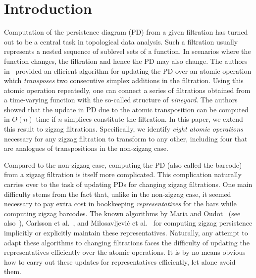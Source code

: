 \documentclass[letterpaper,11pt]{article}
\theoremstyle{mythmstyle}
\theoremstyle{mydefstyle}
\theoremstyle{plain}
\theoremstyle{definition}
\newcommand{\<}[1]{\langle #1\rangle}
\begin{document}
\section{Introduction}
\label{sec:intro}
Computation of the persistence diagram (PD) from a given filtration has turned out to
be a central task in topological data analysis. Such a filtration usually represents
a nested sequence of sublevel sets of a function. In scenarios where the function changes, the filtration and hence the PD may also change. The authors in~\cite{cohen2006vines} provided
an efficient algorithm for updating the PD over an atomic operation which
\emph{transposes} two consecutive simplex additions in the filtration. 
Using this atomic operation repeatedly, one can connect a series of filtrations obtained from a time-varying function with the so-called structure of \emph{vineyard}. 
The authors~\cite{cohen2006vines} showed that the update in PD due to the atomic transposition can be computed in $O(n)$ time if $n$ simplices constitute the filtration. In this paper, we extend this result to zigzag filtrations.
Specifically, we identify \emph{eight atomic operations}
necessary for any zigzag filtration
to transform to any other,
including four that are analogues of transpositions in the non-zigzag case.


Compared to the non-zigzag case, computing the PD (also called the barcode) from a zigzag filtration is itself more complicated. This complication naturally carries over to the task of
updating PDs for changing zigzag filtrations. One main difficulty stems
from the fact that, unlike in the non-zigzag case, it seemed necessary to pay extra cost
in bookkeeping
\emph{representatives} for the bars while computing zigzag barcodes.
The known algorithms by Maria and Oudot~\cite{maria2014zigzag,maria2016computing} (see also~\cite{maria2019discrete}),
Carlsson et al.~\cite{carlsson2009zigzag-realvalue}, and Milosavljevi{\'c} et al.~\cite{milosavljevic2011zigzag} for computing zigzag persistence implicitly or explicitly
maintain these representatives. Naturally, any attempt to adapt these algorithms
to changing filtrations faces the difficulty of updating the representatives efficiently
over the atomic operations. It is by no means obvious how to carry out these updates for
representatives efficiently, let alone avoid them. 
\end{document}

